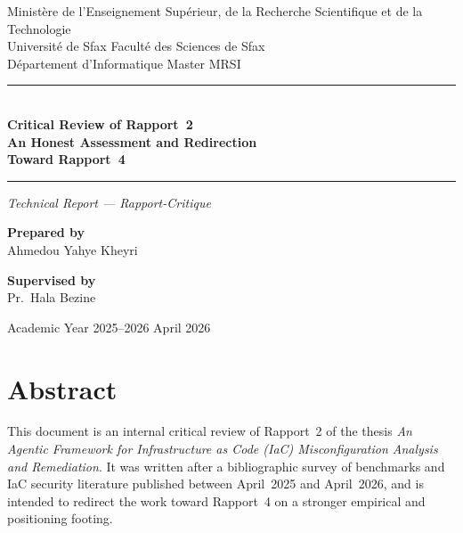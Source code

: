 \documentclass[11pt, a4paper]{report}
\begin{document}

\begin{titlepage}
  \centering

  \vspace*{2.5cm}
  {\small Ministère de l'Enseignement Supérieur, de la Recherche Scientifique
   et de la Technologie}\\[4pt]
  {\small Université de Sfax \enspace\textbar\enspace Faculté des Sciences de Sfax}\\[4pt]
  {\small Département d'Informatique \enspace\textbar\enspace Master MRSI}

  \vspace{2.5cm}
  \noindent\rule{\linewidth}{0.6pt}\\[0.8cm]

  {\LARGE\bfseries\color{critblue}
    Critical Review of Rapport~2\\[6pt]
    An Honest Assessment and Redirection\\[4pt]
    Toward Rapport~4
  }\\[0.8cm]

  \noindent\rule{\linewidth}{0.6pt}

  \vspace{0.6cm}
  {\normalsize\itshape Technical Report --- Rapport-Critique}

  \vspace{3cm}
  \begin{minipage}[t]{0.45\textwidth}
    \raggedright
    {\small\bfseries Prepared by}\\[4pt]
    {\normalsize Ahmedou Yahye Kheyri}
  \end{minipage}
  \hfill
  \begin{minipage}[t]{0.45\textwidth}
    \raggedleft
    {\small\bfseries Supervised by}\\[4pt]
    {\normalsize Pr.\ Hala Bezine}
  \end{minipage}

  \vfill
  {\small Academic Year 2025--2026 \enspace\textbar\enspace April 2026}
  \vspace{1cm}
\end{titlepage}

\chapter*{Abstract}

This document is an internal critical review of Rapport~2 of the thesis
\emph{An Agentic Framework for Infrastructure as Code (IaC) Misconfiguration
Analysis and Remediation}. It was written after a bibliographic survey of
benchmarks and IaC security literature published between April~2025 and
April~2026, and is intended to redirect the work toward Rapport~4 on a
stronger empirical and positioning footing.
\end{document}
